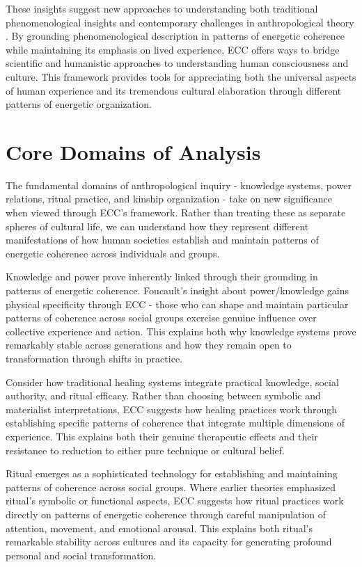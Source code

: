 \begin{refsection}
These insights suggest new approaches to understanding both traditional phenomenological insights and contemporary challenges in anthropological theory \cite{serres1995natural}. By grounding phenomenological description in patterns of energetic coherence while maintaining its emphasis on lived experience, ECC offers ways to bridge scientific and humanistic approaches to understanding human consciousness and culture. This framework provides tools for appreciating both the universal aspects of human experience and its tremendous cultural elaboration through different patterns of energetic organization.

\section{Core Domains of Analysis}

The fundamental domains of anthropological inquiry - knowledge systems, power relations, ritual practice, and kinship organization - take on new significance when viewed through ECC's framework. Rather than treating these as separate spheres of cultural life, we can understand how they represent different manifestations of how human societies establish and maintain patterns of energetic coherence across individuals and groups.

Knowledge and power prove inherently linked through their grounding in patterns of energetic coherence. Foucault's insight about power/knowledge gains physical specificity through ECC - those who can shape and maintain particular patterns of coherence across social groups exercise genuine influence over collective experience and action. This explains both why knowledge systems prove remarkably stable across generations and how they remain open to transformation through shifts in practice.

Consider how traditional healing systems integrate practical knowledge, social authority, and ritual efficacy. Rather than choosing between symbolic and materialist interpretations, ECC suggests how healing practices work through establishing specific patterns of coherence that integrate multiple dimensions of experience. This explains both their genuine therapeutic effects and their resistance to reduction to either pure technique or cultural belief.

Ritual emerges as a sophisticated technology for establishing and maintaining patterns of coherence across social groups. Where earlier theories emphasized ritual's symbolic or functional aspects, ECC suggests how ritual practices work directly on patterns of energetic coherence through careful manipulation of attention, movement, and emotional arousal. This explains both ritual's remarkable stability across cultures and its capacity for generating profound personal and social transformation.


\end{refsection}
